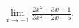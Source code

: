 \label{problemlim(xto-1)(2x^2+3x+1)/(3x^2-2x-5)}
$\displaystyle\lim\limits_{x\to -1}\frac{2x^2+3x+1}{3x^2-2x-5} $.

